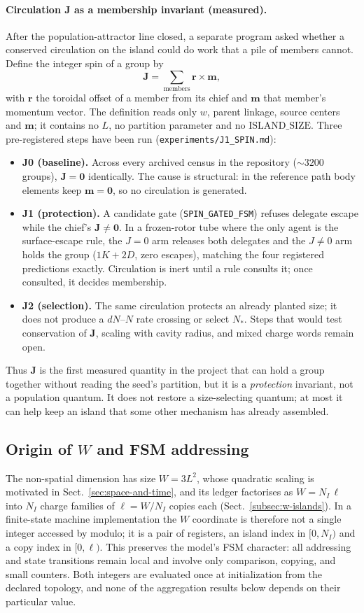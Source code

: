 \documentclass[a4paper]{article}
\begin{document}
\paragraph{Circulation $\mathbf{J}$ as a membership invariant (measured).}
After the population-attractor line closed, a separate program asked whether a conserved circulation on the island could do work that a pile of members cannot. Define the integer spin of a group by
\[
\mathbf{J}=\sum_{\mathrm{members}}\mathbf{r}\times\mathbf{m},
\]
with \(\mathbf{r}\) the toroidal offset of a member from its chief and \(\mathbf{m}\) that member's momentum vector. The definition reads only \(w\), parent linkage, source centers and \(\boldsymbol{m}\); it contains no \(L\), no partition parameter and no \(\mathrm{ISLAND\_SIZE}\). Three pre-registered steps have been run (\texttt{experiments/J1\_SPIN.md}):
\begin{itemize}
\item \textbf{J0 (baseline).} Across every archived census in the repository (\(\sim 3200\) groups), \(\mathbf{J}=\mathbf{0}\) identically. The cause is structural: in the reference path body elements keep \(\boldsymbol{m}=\mathbf{0}\), so no circulation is generated.
\item \textbf{J1 (protection).} A candidate gate (\texttt{SPIN\_GATED\_FSM}) refuses delegate escape while the chief's \(\mathbf{J}\neq\mathbf{0}\). In a frozen-rotor tube where the only agent is the surface-escape rule, the \(J=0\) arm releases both delegates and the \(J\neq 0\) arm holds the group (\(1K+2D\), zero escapes), matching the four registered predictions exactly. Circulation is inert until a rule consults it; once consulted, it decides membership.
\item \textbf{J2 (selection).} The same circulation protects an already planted size; it does not produce a \(dN\)--\(N\) rate crossing or select \(N_*\). Steps that would test conservation of \(\mathbf{J}\), scaling with cavity radius, and mixed charge words remain open.
\end{itemize}
Thus \(\mathbf{J}\) is the first measured quantity in the project that can hold a group together without reading the seed's partition, but it is a \emph{protection} invariant, not a population quantum. It does not restore a size-selecting quantum; at most it can help keep an island that some other mechanism has already assembled.
\subsection{Origin of $W$ and FSM addressing}
The non-spatial dimension has size $W=3L^{2}$, whose quadratic scaling is motivated in Sect.~\ref{sec:space-and-time}, and its ledger factorises as $W=N_I\,\ell$ into $N_{I}$ charge families of $\ell=W/N_I$ copies each (Sect.~\ref{subsec:w-islands}). In a finite-state machine implementation the $W$ coordinate is therefore not a single integer accessed by modulo; it is a pair of registers, an island index in $[0,N_I)$ and a copy index in $[0,\ell)$. This preserves the model's FSM character: all addressing and state transitions remain local and involve only comparison, copying, and small counters.  Both integers are evaluated once at initialization from the declared topology, and none of the aggregation results below depends on their particular value.
\end{document}
